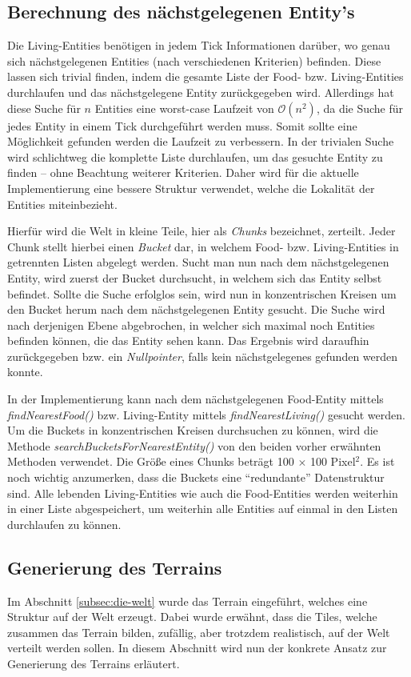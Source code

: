 \documentclass[course=erap]{aspdoc}
\begin{document}
\subsection{Berechnung des nächstgelegenen Entity's}
Die Living-Entities benötigen in jedem Tick Informationen darüber, wo genau sich nächstgelegenen Entities (nach verschiedenen Kriterien) befinden. Diese lassen sich trivial finden, indem die gesamte Liste der Food- bzw. Living-Entities durchlaufen und das nächstgelegene Entity zurückgegeben wird. Allerdings hat diese Suche für \(n\) Entities eine worst-case Laufzeit von \(\mathcal{O}(n^2)\), da die Suche für jedes Entity in einem Tick durchgeführt werden muss. Somit sollte eine Möglichkeit gefunden werden die Laufzeit zu verbessern. In der trivialen Suche wird schlichtweg die komplette Liste durchlaufen, um das gesuchte Entity zu finden -- ohne Beachtung weiterer Kriterien. Daher wird für die aktuelle Implementierung eine bessere Struktur verwendet, welche die Lokalität der Entities miteinbezieht.

Hierfür wird die Welt in kleine Teile, hier als \emph{Chunks} bezeichnet, zerteilt. Jeder Chunk stellt hierbei einen \emph{Bucket} dar, in welchem Food- bzw. Living-Entities in getrennten Listen abgelegt werden. Sucht man nun nach dem nächstgelegenen Entity, wird zuerst der Bucket durchsucht, in welchem sich das Entity selbst befindet. Sollte die Suche erfolglos sein, wird nun in konzentrischen Kreisen um den Bucket herum nach dem nächstgelegenen Entity gesucht. Die Suche wird nach derjenigen Ebene abgebrochen, in welcher sich maximal noch Entities befinden können, die das Entity sehen kann. Das Ergebnis wird daraufhin zurückgegeben bzw. ein \emph{Nullpointer}, falls kein nächstgelegenes gefunden werden konnte.

In der Implementierung kann nach dem nächstgelegenen Food-Entity mittels \emph{findNearestFood()} bzw. Living-Entity mittels \emph{findNearestLiving()} gesucht werden. Um die Buckets in konzentrischen Kreisen durchsuchen zu können, wird die Methode \emph{searchBucketsForNearestEntity()} von den beiden vorher erwähnten Methoden verwendet. Die Größe eines Chunks beträgt 100 $\times$ 100 Pixel\(^2\). Es ist noch wichtig anzumerken, dass die Buckets eine "`redundante"' Datenstruktur sind. Alle lebenden Living-Entities wie auch die Food-Entities werden weiterhin in einer Liste abgespeichert, um weiterhin alle Entities auf einmal in den Listen durchlaufen zu können.


\subsection{Generierung des Terrains}
Im Abschnitt \ref{subsec:die-welt} wurde das Terrain eingeführt, welches eine Struktur auf der Welt erzeugt. Dabei wurde erwähnt, dass die Tiles, welche zusammen das Terrain bilden, zufällig, aber trotzdem realistisch, auf der Welt verteilt werden sollen. In diesem Abschnitt wird nun der konkrete Ansatz zur Generierung des Terrains erläutert.
\end{document}
